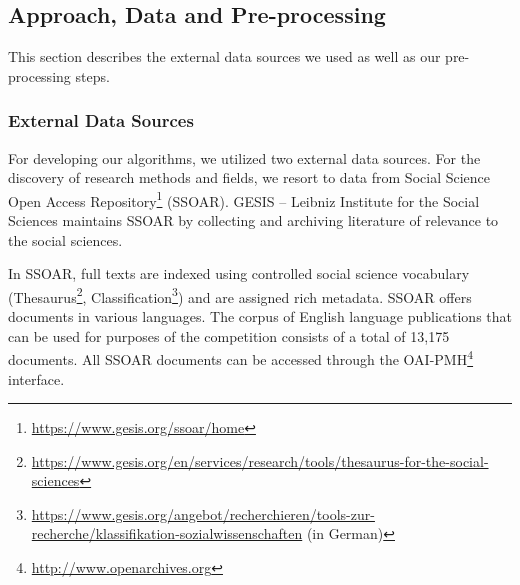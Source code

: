\subsection{Approach, Data and Pre-processing}
\label{sec:overview}
This section describes the external data sources we used as well as our pre-processing steps.



\subsubsection{External Data Sources}
\label{section:external_data_sources}
For developing our algorithms, we utilized two external data sources. For the discovery of research methods and fields, we resort to data from Social Science Open Access Repository\footnote{\url{https://www.gesis.org/ssoar/home}} (SSOAR). 
GESIS – Leibniz Institute for the Social Sciences maintains  SSOAR by collecting and archiving literature of relevance to the social sciences. 

In SSOAR, full texts are indexed using controlled social science vocabulary (Thesaurus\footnote{\url{https://www.gesis.org/en/services/research/tools/thesaurus-for-the-social-sciences}}, Classification\footnote{\url{https://www.gesis.org/angebot/recherchieren/tools-zur-recherche/klassifikation-sozialwissenschaften} (in German)}) and are assigned rich metadata. SSOAR offers documents in various languages. The corpus of English language publications that can be used for purposes of the competition consists of a total of 13,175 documents. All SSOAR documents can be accessed through the OAI-PMH\footnote{{\url{http://www.openarchives.org}}} interface. 

